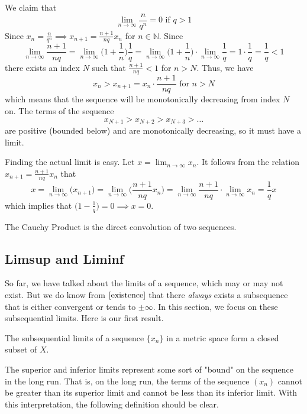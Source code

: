   \begin{example}
    We claim that 
    \[\lim_{n\rightarrow \infty} \frac{n}{q^n} = 0 \text{ if } q>1\]
    Since $x_n = \frac{n}{q^n} \implies x_{n+1} = \frac{n+1}{nq} x_n$ for $n \in \mathbb{N}$. Since 
    \[\lim_{n\rightarrow \infty} \frac{n+1}{nq} = \lim_{n \rightarrow \infty} \bigg(1 + \frac{1}{n}\bigg) \frac{1}{q} = \lim_{n\rightarrow \infty} \bigg( 1 + \frac{1}{n} \bigg) \cdot \lim_{n\rightarrow \infty} \frac{1}{q} = 1 \cdot \frac{1}{q} = \frac{1}{q} < 1\]
    there exists an index $N$ such that $\frac{n+1}{nq} < 1$ for $n>N$. Thus, we have 
    \[x_n > x_{n+1} = x_n \cdot \frac{n+1}{nq} \text{ for } n > N\]
    which means that the sequence will be monotonically decreasing from index $N$ on. The terms of the sequence
    \[x_{N+1} > x_{N+2} > x_{N+3} > \ldots\]
    are positive (bounded below) and are monotonically decreasing, so it must have a limit. 

    Finding the actual limit is easy. Let $x = \lim_{n \rightarrow \infty} x_n$. It follows from the relation $x_{n+1} = \frac{n+1}{nq} x_n$ that
    \[x = \lim_{n\rightarrow \infty} \big(x_{n+1}\big) = \lim_{n \rightarrow \infty} \bigg(\frac{n+1}{nq} x_n \bigg) = \lim_{n \rightarrow \infty} \frac{n+1}{nq} \cdot \lim_{n \rightarrow \infty} x_n = \frac{1}{q} x\]
    which implies that $\big( 1 - \frac{1}{q}\big) = 0 \implies x = 0$.
  \end{example}

  \begin{definition}
    The Cauchy Product is the direct convolution of two sequences. 
  \end{definition}

\subsection{Limsup and Liminf} 

  So far, we have talked about the limits of a sequence, which may or may not exist. But we do know from $\ref{existence}$ that there \textit{always} exists a subsequence that is either convergent or tends to $\pm \infty$. In this section, we focus on these subsequential limits. Here is our first result. 

  \begin{theorem}
    The subsequential limits of a sequence $\{x_n\}$ in a metric space form a closed subset of $X$. 
  \end{theorem}

  The superior and inferior limits represent some sort of "bound" on the sequence in the long run. That is, on the long run, the terms of the sequence $(x_n)$ cannot be greater than its superior limit and cannot be less than its inferior limit. With this interpretation, the following definition should be clear. 

